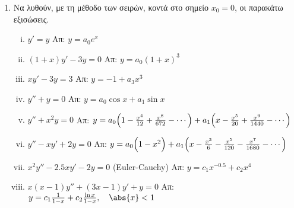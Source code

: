 


\pagestyle{askhseis}
\everymath{\displaystyle}





\begin{center}
\end{center}

\vspace{\baselineskip}

\begin{enumerate}
  \item Να λυθούν, με τη μέθοδο των σειρών, κοντά στο σημείο $ x_{0}=0 $, οι παρακάτω 
    εξισώσεις.
    \begin{enumerate}[i)]
      \item $ y'=y $
        \hfill Απ: $ y= a_{0}e^{x} $ 

      \item $ (1+x)y'-3y=0 $
        \hfill Απ: $ y= a_{0}(1+x)^{3} $ 

      \item $ x y'-3y=3 $ %
        \hfill Απ: $ y= - 1 + a_{3} x^{3} $ 

      \item $ y''+y=0 $ %
        \hfill Απ: $ y= a_{0} \cos{x} + a_{1} \sin{x} $

      \item $ y'' + x^{2}y = 0 $ %
        \hfill Απ: $ y= a_{0}\Bigl(1- \frac{x^{4}}{12} + \frac{x^{8}}{672} - 
          \cdots\Bigr) + a_{1} \Bigl(x - \frac{x^{5}}{20} + \frac{x^{9}}{1440} - 
        \cdots\Bigr) $ 

      \item $ y'' -xy'+2y=0 $ %
        \hfill Απ: $ y = a_{0}\Bigl(1-x^{2}\Bigr) + a_{1}
        \Bigl(x - \frac{x^{3}}{6} - \frac{x^{5}}{120} - \frac{x^{7}}{1680} - 
        \cdots \Bigr) $ 

      \item  $ x^{2}y'' - 2.5 x y' -2y=0 $ \quad (Euler-Cauchy) %
        \hfill Απ: $ y = c_{1}x^{-0.5}+ c_{2}x^{4} $ 

      \item $ x(x-1)y''+(3x-1)y'+y=0 $ %
        \hfill Απ: $ y= c_{1} \frac{1}{1-x} + c_{2} \frac{\ln{x}}{1-x}, 
        \quad \abs{x} <1$ 


\end{enumerate}
\end{enumerate}
